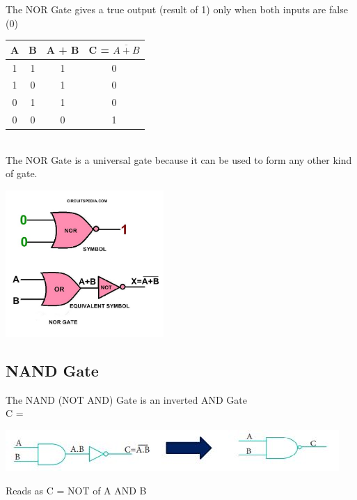 \documentclass[10pt,a4paper,onecolumn]{article}
\begin{document}
The NOR Gate gives a true output (result of 1) only when both inputs are false (0) \\
\begin{table}[h!]
	\begin{center}
		\begin{tabular}{c|c|c|c}
			\textbf{A} & \textbf{B} &
			\textbf{A + B} & \textbf{C = $\overline{A + B}$}\\
			\hline
			1 & 1 & 1 & 0 \\
			\hline
			1 & 0 & 1 & 0 \\
			\hline
			0 & 1 & 1 & 0\\
			\hline
			0 & 0 & 0 & 1\\
			\hline
		\end{tabular}
	\end{center}
\end{table} \\


\color{red}The NOR Gate is a universal gate because it can be used to form any other kind of gate. \\ \color{black}
\begin{center}\includegraphics[width=6cm]{gst15}\end{center}

\subsection{NAND Gate}
The NAND (NOT AND) Gate is an inverted AND Gate \\
C = \begin{center}\includegraphics{gst16}\end{center}
\color{red}Reads as C = NOT of A AND B \\ \color{black}
\end{document}

